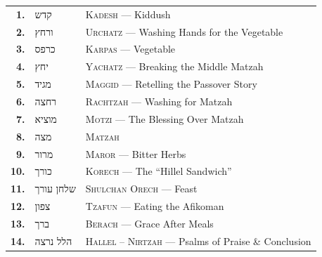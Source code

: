 \documentclass[11pt, openany]{book}
\providecommand{\texthebrew}[1]{{\hebrewfont\beginR #1\endR}}
\begin{document}
\begin{center}
\renewcommand{\arraystretch}{1.8}
\begin{tabular}{r@{\quad}l@{\qquad}l}
  \textcolor{sedergold}{\sffamily\bfseries 1.} &
    \texthebrew{קדש} &
    \textsc{Kadesh} --- Kiddush \\
  \textcolor{sedergold}{\sffamily\bfseries 2.} &
    \texthebrew{ורחץ} &
    \textsc{Urchatz} --- Washing Hands for the Vegetable \\
  \textcolor{sedergold}{\sffamily\bfseries 3.} &
    \texthebrew{כרפס} &
    \textsc{Karpas} --- Vegetable \\
  \textcolor{sedergold}{\sffamily\bfseries 4.} &
    \texthebrew{יחץ} &
    \textsc{Yachatz} --- Breaking the Middle Matzah \\
  \textcolor{sedergold}{\sffamily\bfseries 5.} &
    \texthebrew{מגיד} &
    \textsc{Maggid} --- Retelling the Passover Story \\
  \textcolor{sedergold}{\sffamily\bfseries 6.} &
    \texthebrew{רחצה} &
    \textsc{Rachtzah} --- Washing for Matzah \\
  \textcolor{sedergold}{\sffamily\bfseries 7.} &
    \texthebrew{מוציא} &
    \textsc{Motzi} --- The Blessing Over Matzah \\
  \textcolor{sedergold}{\sffamily\bfseries 8.} &
    \texthebrew{מצה} &
    \textsc{Matzah} \\
  \textcolor{sedergold}{\sffamily\bfseries 9.} &
    \texthebrew{מרור} &
    \textsc{Maror} --- Bitter Herbs \\
  \textcolor{sedergold}{\sffamily\bfseries 10.} &
    \texthebrew{כורך} &
    \textsc{Korech} --- The ``Hillel Sandwich'' \\
  \textcolor{sedergold}{\sffamily\bfseries 11.} &
    \texthebrew{שלחן עורך} &
    \textsc{Shulchan Orech} --- Feast \\
  \textcolor{sedergold}{\sffamily\bfseries 12.} &
    \texthebrew{צפון} &
    \textsc{Tzafun} --- Eating the Afikoman \\
  \textcolor{sedergold}{\sffamily\bfseries 13.} &
    \texthebrew{ברך} &
    \textsc{Berach} --- Grace After Meals \\
  \textcolor{sedergold}{\sffamily\bfseries 14.} &
    \texthebrew{הלל נרצה} &
    \textsc{Hallel -- Nirtzah} --- Psalms of Praise \& Conclusion \\
\end{tabular}
\end{center}

\vspace{\fill}
\end{document}

